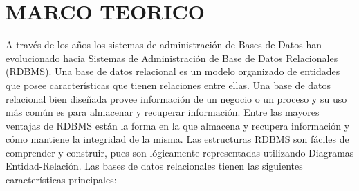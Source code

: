 \section{MARCO TEORICO} 
A través de los años los sistemas de administración de Bases de Datos han
evolucionado hacia Sistemas de Administración de Base de Datos Relacionales
(RDBMS). Una base de datos relacional es un modelo organizado de entidades
que posee características que tienen relaciones entre ellas. Una base de datos
relacional bien diseñada provee información de un negocio o un proceso y su uso
más común es para almacenar y recuperar información. Entre las mayores
ventajas de RDBMS están la forma en la que almacena y recupera información y
cómo mantiene la integridad de la misma. Las estructuras RDBMS son fáciles de
comprender y construir, pues son lógicamente representadas utilizando Diagramas
Entidad-Relación. Las bases de datos relacionales tienen las siguientes
características principales: 
